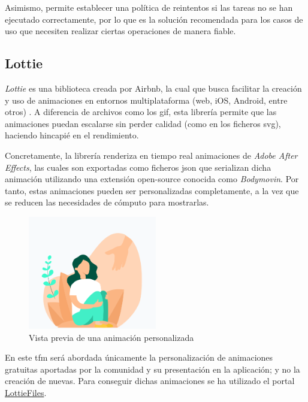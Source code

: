         Asimismo, permite establecer una política de reintentos si las tareas no se han ejecutado correctamente, por lo que es la solución recomendada para los casos de uso que necesiten realizar ciertas operaciones de manera fiable.

    \subsection{Lottie}
        \textit{Lottie} es una biblioteca creada por Airbnb, la cual que busca facilitar la creación y uso de animaciones en entornos multiplataforma (web, iOS, Android, entre otros) \cite{rubianes_lottie_2021}. A diferencia de archivos como los \gls{gif}, esta librería permite que las animaciones puedan escalarse sin perder calidad (como en los ficheros \gls{svg}), haciendo hincapié en el rendimiento.

        Concretamente, la librería renderiza en tiempo real animaciones de \textit{Adobe After Effects}, las cuales son exportadas como ficheros \gls{json} que serializan dicha animación \cite{airbnb_design_lottie_nodate} utilizando una extensión \gls{open-source} conocida como \textit{Bodymovin}. Por tanto, estas animaciones pueden ser personalizadas completamente, a la vez que se reducen las necesidades de cómputo para mostrarlas. 
        
        \begin{figure}[h]
            \centering
            \includegraphics[width=0.5\textwidth]{figures/Animacion de ejemplo.PNG}
            \caption{Vista previa de una animación personalizada}
            \label{figure:lottie:animacion_ejemplo}
        \end{figure}

        En este \gls{tfm} será abordada únicamente la personalización de animaciones gratuitas aportadas por la comunidad y su presentación en la aplicación; y no la creación de nuevas. Para conseguir dichas animaciones se ha utilizado el portal \href{https://lottiefiles.com/}{LottieFiles}.

